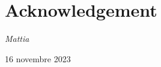 \chapter*{Acknowledgement}


\begin{flushright}
    \emph{Mattia}\par
    16 novembre 2023
\end{flushright}